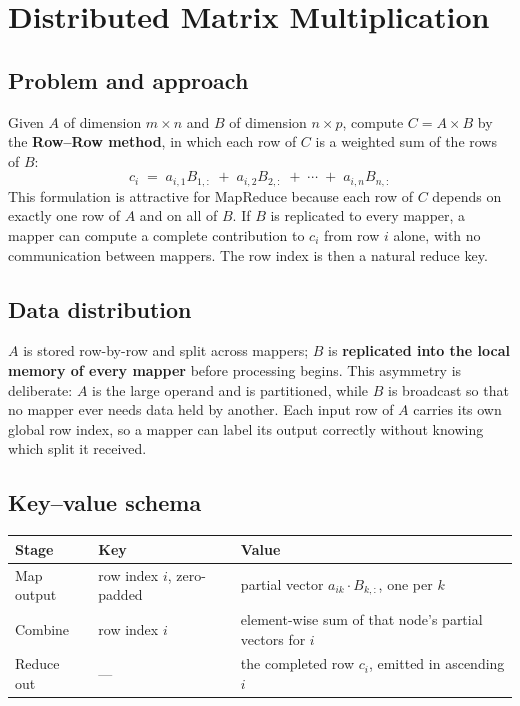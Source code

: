 \documentclass[11pt,a4paper]{article}
\begin{document}
\section{Distributed Matrix Multiplication}

\subsection{Problem and approach}
Given $A$ of dimension $m \times n$ and $B$ of dimension $n \times p$, compute
$C = A \times B$ by the \textbf{Row--Row method}, in which each row of $C$ is a
weighted sum of the rows of $B$:
\[
c_i \;=\; a_{i,1}B_{1,:} \;+\; a_{i,2}B_{2,:} \;+\; \cdots \;+\; a_{i,n}B_{n,:}
\]
This formulation is attractive for MapReduce because each row of $C$ depends on exactly
one row of $A$ and on all of $B$. If $B$ is replicated to every mapper, a mapper can
compute a complete contribution to $c_i$ from row $i$ alone, with no communication
between mappers. The row index is then a natural reduce key.

\subsection{Data distribution}
$A$ is stored row-by-row and split across mappers; $B$ is \textbf{replicated into the
local memory of every mapper} before processing begins. This asymmetry is deliberate:
$A$ is the large operand and is partitioned, while $B$ is broadcast so that no mapper
ever needs data held by another. Each input row of $A$ carries its own global row index,
so a mapper can label its output correctly without knowing which split it received.

\subsection{Key--value schema}
\begin{center}\small
\begin{tabular}{@{}llp{7.6cm}@{}}
\toprule
\textbf{Stage} & \textbf{Key} & \textbf{Value} \\
\midrule
Map output & row index $i$, zero-padded & partial vector $a_{ik}\cdot B_{k,:}$, one per $k$ \\
Combine    & row index $i$ & element-wise sum of that node's partial vectors for $i$ \\
Reduce out & --- & the completed row $c_i$, emitted in ascending $i$ \\
\bottomrule
\end{tabular}
\end{center}
\end{document}
